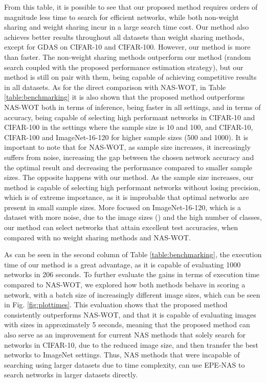 \documentclass[10pt, conference]{IEEEtran}
\begin{document}
From this table, it is possible to see that our proposed method requires orders of magnitude less time to search for efficient networks, while both non-weight sharing and weight sharing incur in a large search time cost. Our method also achieves better results throughout all datasets than weight sharing methods, except for GDAS on CIFAR-10 and CIFAR-100. However, our method is more than  faster. The non-weight sharing methods outperform our method (random search coupled with the proposed performance estimation strategy), but our method is still on pair with them, being capable of achieving competitive results in all datasets. As for the direct comparison with NAS-WOT, in Table \ref{table:benchmarking} it is also shown that the proposed method outperforms NAS-WOT both in terms of inference, being faster in all settings, and in terms of accuracy, being capable of selecting high performant networks in CIFAR-10 and CIFAR-100 in the settings where the sample size is 10 and 100, and CIFAR-10, CIFAR-100 and ImageNet-16-120 for higher sample sizes (500 and 1000). It is important to note that for NAS-WOT, as sample size increases, it increasingly suffers from noise, increasing the gap between the chosen network accuracy and the optimal result and decreasing the performance compared to smaller sample sizes. The opposite happens with our method. As the sample size increases, our method is capable of selecting high performant networks without losing precision, which is of extreme importance, as it is improbable that optimal networks are present in small sample sizes. More focused on ImageNet-16-120, which is a dataset with more noise, due to the image sizes () and the high number of classes, our method can select networks that attain excellent test accuracies, when compared with no weight sharing methods and NAS-WOT.


As can be seen in the second column of Table \ref{table:benchmarking}, the execution time of our method is a great advantage, as it is capable of evaluating 1000 networks in 206 seconds. To further evaluate the gains in terms of execution time compared to NAS-WOT, we explored how both methods behave in scoring a network, with a batch size of increasingly different image sizes, which can be seen in Fig. \ref{fig:plottimes}. This evaluation shows that the proposed method consistently outperforms NAS-WOT, and that it is capable of evaluating images with sizes  in approximately 5 seconds, meaning that the proposed method can also serve as an improvement for current NAS methods that solely search for networks in CIFAR-10, due to the reduced image size, and then transfer the best networks to ImageNet settings. Thus, NAS methods that were incapable of searching using larger datasets due to time complexity, can use EPE-NAS to search networks in larger datasets directly.
\end{document}
